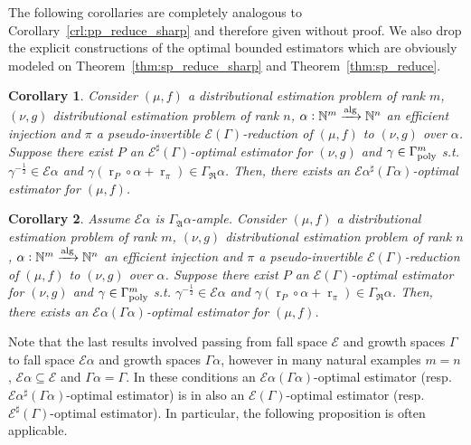 \documentclass{article}
\numberwithin{equation}{section}
\theoremstyle{definition}
\theoremstyle{plain}
\newtheorem{corollary}{Corollary}[section]
\DeclareMathOperator{\R}{r}
\newcommand{\Nats}{\mathbb{N}}
\newcommand{\GrowR}{\Gamma_{\mathfrak{R}}}
\newcommand{\GrowA}{\Gamma_{\mathfrak{A}}}
\newcommand{\Fall}{\mathcal{E}}
\newcommand{\EG}{\Fall(\Gamma)}
\newcommand{\ESG}{\Fall^\sharp(\Gamma)}
\newcommand{\GammaPoly}{\Gamma_{\textnormal{poly}}}
\newcommand{\Alg}{\xrightarrow{\textnormal{alg}}}
\begin{document}
The following corollaries are completely analogous to Corollary~\ref{crl:pp_reduce_sharp} and therefore given without proof. We also drop the explicit constructions of the optimal bounded estimators which are obviously modeled on Theorem~\ref{thm:sp_reduce_sharp} and Theorem~\ref{thm:sp_reduce}.

\begin{samepage}
\begin{corollary}

Consider $(\mu,f)$ a distributional estimation problem of rank ${m}$, $(\nu,g)$ distributional estimation problem of rank ${n}$, ${\alpha: \Nats^m \Alg \Nats^n}$ an efficient injection and $\pi$ a pseudo-invertible $\EG$-reduction of $(\mu, f)$ to $(\nu, g)$ over ${\alpha}$. Suppose there exist ${P}$ an $\ESG$-optimal estimator for $(\nu, g)$ and ${\gamma \in \GammaPoly^m}$ s.t. ${\gamma^{-\frac{1}{2}} \in \Fall \alpha}$ and ${\gamma(\R_P \circ \alpha + \R_\pi) \in \GrowR \alpha}$. Then, there exists an $\Fall \alpha^\sharp (\Gamma \alpha)$-optimal estimator for $(\mu, f)$.


\end{corollary}
\end{samepage}

\begin{samepage}
\begin{corollary}

Assume ${\Fall \alpha}$ is ${\GrowA \alpha}$-ample. Consider $(\mu,f)$ a distributional estimation problem of rank ${m}$, $(\nu,g)$ distributional estimation problem of rank ${n}$, ${\alpha: \Nats^m \Alg \Nats^n}$ an efficient injection and $\pi$ a pseudo-invertible $\EG$-reduction of $(\mu, f)$ to $(\nu, g)$ over ${\alpha}$. Suppose there exist ${P}$ an $\EG$-optimal estimator for $(\nu, g)$ and ${\gamma \in \GammaPoly^m}$ s.t. ${\gamma^{-\frac{1}{2}} \in \Fall \alpha}$ and ${\gamma(\R_P \circ \alpha + \R_\pi) \in \GrowR \alpha}$. Then, there exists an $\Fall \alpha (\Gamma \alpha)$-optimal estimator for $(\mu, f)$.


\end{corollary}
\end{samepage}

Note that the last results involved passing from fall space ${\Fall}$ and growth spaces ${\Gamma}$ to fall space ${\Fall \alpha}$ and growth spaces ${\Gamma \alpha}$, however in many natural examples ${m = n}$, ${\Fall \alpha \subseteq \Fall}$ and ${\Gamma \alpha = \Gamma}$. In these conditions an ${\Fall \alpha (\Gamma \alpha)}$-optimal estimator (resp. ${\Fall \alpha^\sharp(\Gamma \alpha)}$-optimal estimator) is in also an ${\EG}$-optimal estimator (resp. ${\ESG}$-optimal estimator). In particular, the following proposition is often applicable.
\end{document}
